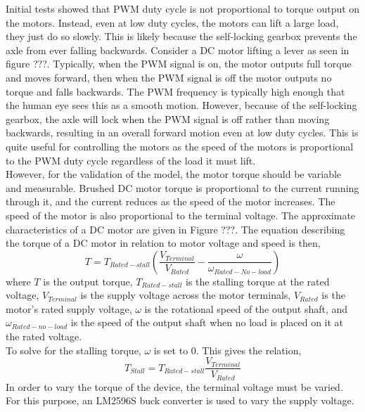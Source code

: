 Initial tests showed that PWM duty cycle is not proportional to torque output on the motors. Instead, even at low duty cycles, the motors can lift a large load, they just do so slowly. This is likely because the self-locking gearbox prevents the axle from ever falling backwards. Consider a DC motor lifting a lever as seen in figure ???. Typically, when the PWM signal is on, the motor outputs full torque and moves forward, then when the PWM signal is off the motor outputs no torque and falls backwards. The PWM frequency is typically high enough that the human eye sees this as a smooth motion. However, because of the self-locking gearbox, the axle will lock when the PWM signal is off rather than moving backwards, resulting in an overall forward motion even at low duty cycles. This is quite useful for controlling the motors as the speed of the motors is proportional to the PWM duty cycle regardless of the load it must lift.\\

However, for the validation of the model, the motor torque should be variable and measurable. Brushed DC motor torque is proportional to the current running through it, and the current reduces as the speed of the motor increases. The speed of the motor is also proportional to the terminal voltage. The approximate characteristics of a DC motor are given in Figure ???. The equation describing the torque of a DC motor in relation to motor voltage and speed is then,
\begin{equation}
	T = T_{Rated-stall}(\frac{V_{Terminal}}{V_{Rated}}-\frac{\omega}{\omega_{Rated-No-load}})
\end{equation}
where $T$ is the output torque, $T_{Rated-stall}$ is the stalling torque at the rated voltage, $V_{Terminal}$ is the supply voltage across the motor terminals, $V_{Rated}$ is the motor's rated supply voltage, $\omega$ is the rotational speed of the output shaft, and $\omega_{Rated-no-load}$ is the speed of the output shaft when no load is placed on it at the rated voltage.\\

To solve for the stalling torque, $\omega$ is set to $0$. This gives the relation,
\begin{equation}
	T_{Stall} = T_{Rated-stall}\frac{V_{Terminal}}{V_{Rated}}
\end{equation}
In order to vary the torque of the device, the terminal voltage must be varied. For this purpose, an LM2596S buck converter is used to vary the supply voltage.

